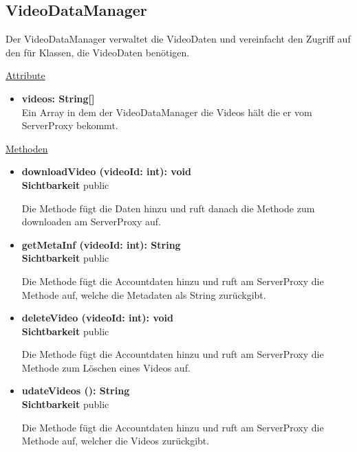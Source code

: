 \newpage
\subsection{VideoDataManager}\label{VideoDataManager}
Der VideoDataManager verwaltet die VideoDaten und vereinfacht den Zugriff auf den  für Klassen, die VideoDaten benötigen.

\underline{Attribute}
\begin{itemize}
\itemsep0pt

\item \textbf{videos: String[]}\hfill\\
Ein Array in dem der VideoDataManager die Videos hält die er vom ServerProxy bekommt.
\end{itemize}

\underline{Methoden}
\begin{itemize}
\itemsep0pt


\item \textbf{downloadVideo (videoId: int): void}\hfill\\
\textbf{Sichtbarkeit} public

Die Methode fügt die  Daten hinzu und ruft danach die Methode zum downloaden am ServerProxy auf.

\item \textbf{getMetaInf (videoId: int): String}\hfill\\
\textbf{Sichtbarkeit} public

Die Methode fügt die Accountdaten hinzu und ruft am ServerProxy die Methode auf, welche die Metadaten als String zurückgibt.

\item \textbf{deleteVideo (videoId: int): void}\hfill\\
\textbf{Sichtbarkeit} public

Die Methode fügt die Accountdaten hinzu und ruft am ServerProxy die Methode zum Löschen eines Videos auf.

\item \textbf{udateVideos (): String}\hfill\\
\textbf{Sichtbarkeit} public

Die Methode fügt die Accountdaten hinzu und ruft am ServerProxy die Methode auf, welcher die Videos zurückgibt.

\end{itemize}
